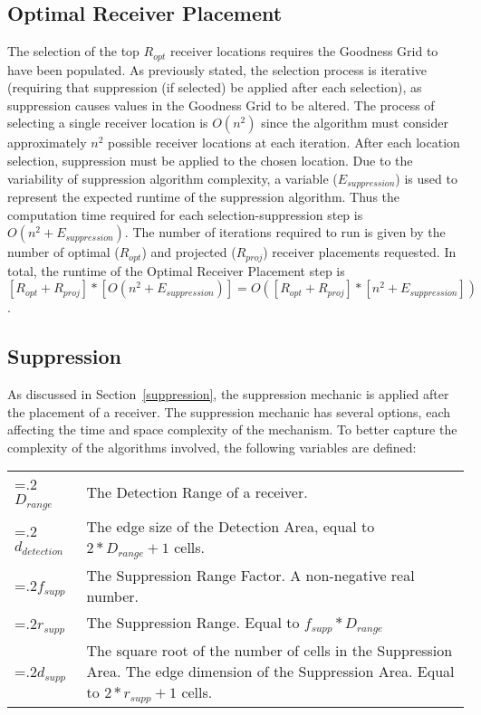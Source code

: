 \subsection{Optimal Receiver Placement}
The selection of the top $R_{opt}$ receiver locations requires the Goodness Grid to have been populated.  As previously stated, the selection process is iterative (requiring that suppression (if selected) be applied after each selection), as suppression causes values in the Goodness Grid to be altered.  The process of selecting a single receiver location is $O(n^2)$ since the algorithm must consider approximately $n^2$ possible receiver locations at each iteration.  After each location selection, suppression must be applied to the chosen location.  Due to the variability of suppression algorithm complexity, a variable  ($E_{suppression}$) is used to represent the expected runtime of the suppression algorithm.  Thus the computation time required for each selection-suppression step is $O(n^2 + E_{suppression})$.  The number of iterations required to run is given by the number of optimal ($R_{opt}$) and projected ($R_{proj}$) receiver placements requested.  In total, the runtime of the Optimal Receiver Placement step is $[R_{opt} + R_{proj}] * [O(n^2 + E_{suppression})] = O([R_{opt} + R_{proj}]* [n^2 + E_{suppression}])$.


\subsection{Suppression}
As discussed in Section~\ref{suppression}, the suppression mechanic is applied after the placement of a receiver.  The suppression mechanic has several options, each affecting the time and space complexity of the mechanism.  To better capture the complexity of the algorithms involved, the following variables are defined: \newline

\noindent\begin{tabularx}{\linewidth}{@{}>{\hsize=.2\hsize}X>{\hsize=1.5\hsize}X@{}}
	
$D_{range}$& The Detection Range of a receiver.\\
$d_{detection}$& The edge size of the Detection Area, equal to $2*D_{range}+1$ cells.\\
$f_{supp}$ & The Suppression Range Factor.  A non-negative real number.\\
$r_{supp}$ & The Suppression Range. Equal to $f_{supp}*D_{range}$\\
$d_{supp}$ & The square root of the number of cells in the Suppression Area.  The edge dimension of the Suppression Area.  Equal to $2*r_{supp} + 1$ cells.\\
\end{tabularx}

